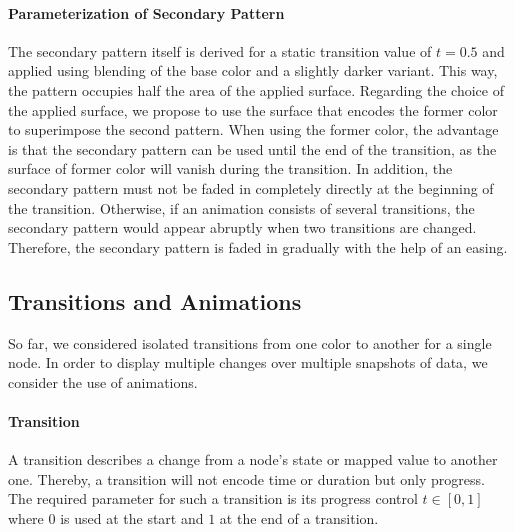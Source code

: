 \documentclass[sigconf%
,natbib=true%
]{acmart}
\begin{document}
\paragraph{Parameterization of Secondary Pattern}
The secondary pattern itself is derived for a static transition value of $t = 0.5$ and applied using blending of the base color and a slightly darker variant.
This way, the pattern occupies half the area of the applied surface.
Regarding the choice of the applied surface, we propose to use the surface that encodes the former color to superimpose the second pattern.
When using the former color, the advantage is that the secondary pattern can be used until the end of the transition, as the surface of former color will vanish during the transition.
In addition, the secondary pattern must not be faded in completely directly at the beginning of the transition.
Otherwise, if an animation consists of several transitions, the secondary pattern would appear abruptly when two transitions are changed.
Therefore, the secondary pattern is faded in gradually with the help of an easing.

\subsection{Transitions and Animations}
So far, we considered isolated transitions from one color to another for a single node.
In order to display multiple changes over multiple snapshots of data, we consider the use of animations.

\paragraph{Transition}
A transition describes a change from a node's state or mapped value to another one.
Thereby, a transition will not encode time or duration but only progress.
The required parameter for such a transition is its progress control $t \in [0, 1]$ where $0$ is used at the start and $1$ at the end of a transition.
\end{document}
